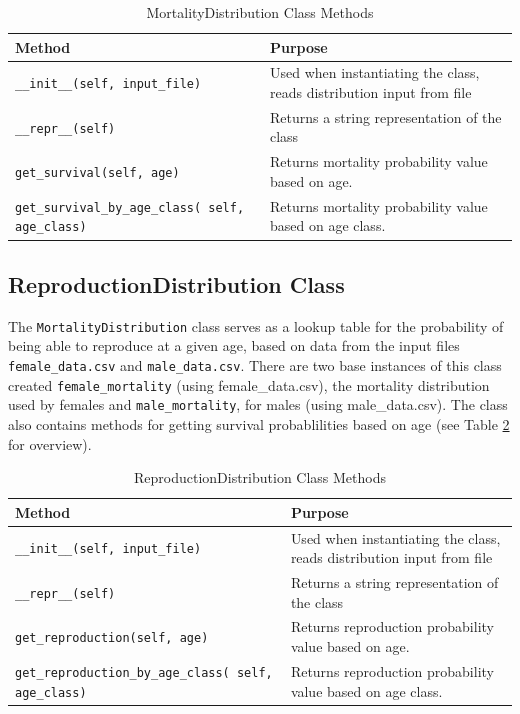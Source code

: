 \documentclass[authoryearcitations]{UoYCSproject}
\begin{document}
\begin{table}[h]
\caption{MortalityDistribution Class Methods}
\label{tbl:mortalityDistributionMethods}
\begin{tabular}{m{} m{}}
\textbf{Method} & \textbf{Purpose} \\\hline
\texttt{\_\_init\_\_(self, input\_file)} & Used when instantiating the class, reads distribution input from file\\\hline
\texttt{\_\_repr\_\_(self)} & Returns a string representation of the class \\\hline
\texttt{get\_survival(self, age)} & Returns mortality probability value based on age.\\\hline
\texttt{get\_survival\_by\_age\_class( self, age\_class)} &  Returns mortality probability value based on age class.
\end{tabular}
\end{table}

\newpage
\subsection{ReproductionDistribution Class}
The \texttt{MortalityDistribution} class serves as a lookup table for the probability of being able to reproduce at a given age, based on data from the input files \texttt{female\_data.csv} and \texttt{male\_data.csv}. There are two base instances of this class created \texttt{female\_mortality} (using female\_data.csv), the mortality distribution used by females and \texttt{male\_mortality}, for males (using male\_data.csv). The class also contains methods for getting survival probablilities based on age (see Table \ref{tbl:reproductionDistributionMethods} for overview).


\begin{table}[h]
\caption{ReproductionDistribution Class Methods}
\label{tbl:reproductionDistributionMethods}
\begin{tabular}{m{} m{}}
\textbf{Method} & \textbf{Purpose} \\\hline
\texttt{\_\_init\_\_(self, input\_file)} & Used when instantiating the class, reads distribution input from file\\\hline
\texttt{\_\_repr\_\_(self)} & Returns a string representation of the class \\\hline
\texttt{get\_reproduction(self, age)} & Returns reproduction probability value based on age.\\\hline
\small\texttt{get\_reproduction\_by\_age\_class( self, age\_class)} \normalsize &  Returns reproduction probability value based on age class.
\end{tabular}
\end{table}
\end{document}
